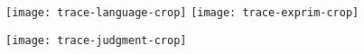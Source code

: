 \documentclass{article}
\begin{document}
\thispagestyle{empty}

\begin{minipage}{\linewidth}
  \texttt{[image: trace-language-crop]}
  \texttt{[image: trace-exprim-crop]}
\end{minipage}

\vspace{.25in}
  
\texttt{[image: trace-judgment-crop]}
  
\end{document}
